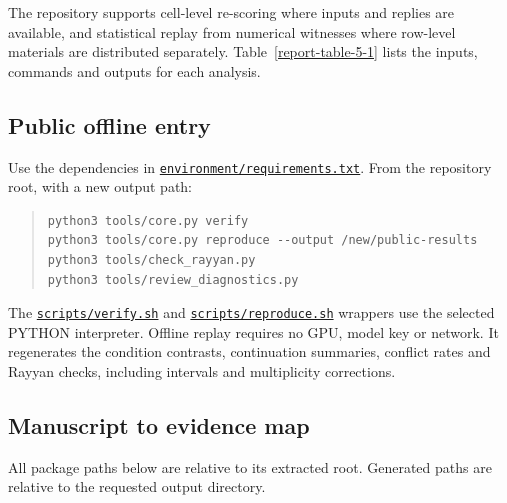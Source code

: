 \documentclass[10pt,a4paper]{article}
\begin{document}
The repository supports cell-level re-scoring where inputs and replies are available, and
statistical replay from numerical witnesses where row-level materials are distributed separately.
Table~\ref{report-table-5-1} lists the inputs, commands and outputs for each analysis.

\subsection{Public offline entry}

Use the dependencies in \href{https://github.com/hinsonver/CoRe-Benchmark/blob/main/environment/requirements.txt}{\nolinkurl{environment/requirements.txt}}. From the repository root, with a new output path:

\begin{quote}
\begin{Verbatim}[fontsize=\footnotesize,fontfamily=cmtt,formatcom={\fontencoding{OT1}\selectfont\def\textasciigrave{\char18}\def\textquotesingle{\char13}}]
python3 tools/core.py verify
python3 tools/core.py reproduce --output /new/public-results
python3 tools/check_rayyan.py
python3 tools/review_diagnostics.py
\end{Verbatim}
\end{quote}

The \href{https://github.com/hinsonver/CoRe-Benchmark/blob/main/scripts/verify.sh}{\nolinkurl{scripts/verify.sh}} and \href{https://github.com/hinsonver/CoRe-Benchmark/blob/main/scripts/reproduce.sh}{\nolinkurl{scripts/reproduce.sh}} wrappers use the selected {\ttfamily\small PYTHON} interpreter. Offline replay requires no GPU, model key or network. It regenerates the condition contrasts, continuation summaries, conflict rates and Rayyan checks, including intervals and multiplicity corrections.

\subsection{Manuscript to evidence map}

All package paths below are relative to its extracted root. Generated paths are relative to the requested output directory.
\end{document}
